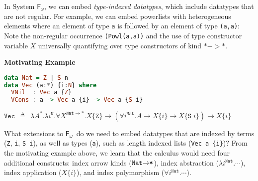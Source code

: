 \documentclass{article}
\newcommand{\Fw}{\ensuremath{\mathsf{F}_\omega}}
\begin{document}
In System \Fw, we can embed \emph{type-indexed datatypes}, which include
datatypes that are not regular. For example, we can embed powerlists with
heterogeneous elements where an element of type \texttt{a} is followed by
an element of type \texttt{(a,a)}:
\\
Note the non-regular occurrence \texttt{(Powl(a,a))} and
the use of type constructor variable $X$ universally quantifying over
type constructors of kind $* -> *$.\\
\begin{center}\vspace*{-14pt}
\textbf{Motivating Example} \vspace*{-8pt}
\end{center}
\begin{snugshade}\vspace{-7pt}
\begin{lstlisting}[basicstyle={\small\ttfamily},language=Haskell]
data Nat = Z | S n
data Vec (a:*) {i:N} where
  VNil  : Vec a {Z}
  VCons : a -> Vec a {i} -> Vec a {S i}
\end{lstlisting}\vspace*{-10pt}
\end{snugshade}\vspace*{-15pt}
\begin{snugshade}\noindent
$
\texttt{{Vec}}\:\:\triangleq\:\:\lambda A^{*}.\lambda i^{\texttt{{N}}}.
\forall X^{\texttt{{Nat}}\to*}.
X\{\texttt{{Z}}\}\to
(\forall i^{\texttt{{Nat}}}.A\to X\{i\}\to X\{\texttt{{S}}\; i\})\to X\{i\}
$
\end{snugshade}\vspace*{-5pt}
What extensions to \Fw\ do we need to embed datatypes that are indexed by
terms (\texttt{Z}, \texttt{i}, \texttt{S i}), as well as types (\texttt{a}),
such as length indexed lists (\verb|Vec a {i}|)? From the motivating example
above, we learn that the calculus would need four additional constructs:
index arrow kinds ($\texttt{{Nat}\ensuremath{\to}*}$),
index abstraction ($\lambda i^{\texttt{{Nat}}}.\cdots$),
index application ($X\{i\}$), and
index polymorphism ($\forall i^{\texttt{{Nat}}}.\cdots$).
\end{document}
